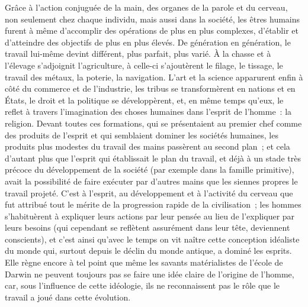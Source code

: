 \documentclass[french,twoside]{book} %
\begin{document}
Grâce à l’action conjuguée de la main, des organes de la parole et du cerveau, non seulement chez chaque individu, mais aussi dans la société, les êtres humains furent à même d’accomplir des opérations de plus en plus complexes, d’établir et d’atteindre des objectifs de plus en plus élevés. De génération en génération, le travail lui-même devint différent, plus parfait, plus varié. À la chasse et à l’élevage s’adjoignit l’agriculture, à celle-ci s’ajoutèrent le filage, le tissage, le travail des métaux, la poterie, la navigation. L’art et la science apparurent enfin à côté du commerce et de l’industrie, les tribus se transformèrent en nations et en États, le droit et la politique se développèrent, et, en même temps qu’eux, le reflet à travers l’imagination des choses humaines dans l’esprit de l’homme : la religion. Devant toutes ces formations, qui se présentaient au premier chef comme des produits de l’esprit et qui semblaient dominer les sociétés humaines, les produits plus modestes du travail des mains passèrent au second plan ; et cela d’autant plus que l’esprit qui établissait le plan du travail, et déjà à un stade très précoce du développement de la société (par exemple dans la famille primitive), avait la possibilité de faire exécuter par d’autres mains que les siennes propres le travail projeté. C’est à l’esprit, au développement et à l’activité du cerveau que fut attribué tout le mérite de la progression rapide de la civilisation ; les hommes s’habituèrent à expliquer leurs actions par leur pensée au lieu de l’expliquer par leurs besoins (qui cependant se reflètent assurément dans leur tête, deviennent conscients), et c’est ainsi qu’avec le temps on vit naître cette conception idéaliste du monde qui, surtout depuis le déclin du monde antique, a dominé les esprits. Elle règne encore à tel point que même les savants matérialistes de l’école de Darwin ne peuvent toujours pas se faire une idée claire de l’origine de l’homme, car, sous l’influence de cette idéologie, ils ne reconnaissent pas le rôle que le travail a joué dans cette évolution.\par
\end{document}
